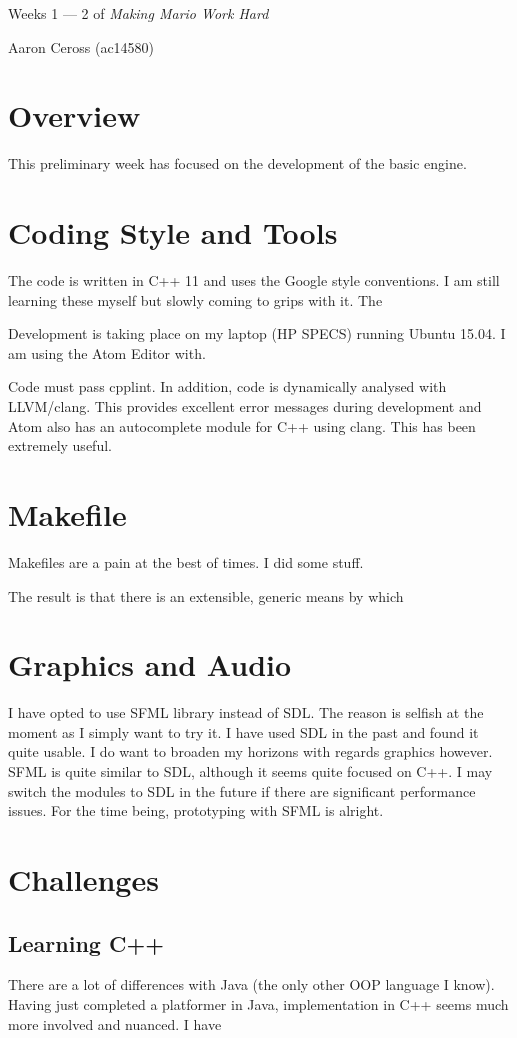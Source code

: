 \documentclass[11pt, a4paper, oneside]{article} %
\begin{document}
\begin{center}\huge Weeks 1 --- 2 of \textit{Making Mario Work Hard}
\par \Large Aaron Ceross (ac14580)
\end{center}


\section{Overview}
This preliminary week has focused on the development of the basic engine.

\section{Coding Style and Tools}

The code is written in C++ 11 and uses the Google style conventions. I am still
learning these myself but slowly coming to grips with it. The

\par

Development is taking place on my laptop (HP SPECS) running Ubuntu 15.04. I am
using the Atom Editor with.

Code must pass cpplint. In addition, code is dynamically analysed with
LLVM/clang. This provides excellent error messages during development and Atom
also has an autocomplete module for C++ using clang. This has been extremely
useful.

\section{Makefile}

Makefiles are a pain at the best of times. I did some stuff.

The result is that there is an extensible, generic means by which

\section{Graphics and Audio}

I have opted to use SFML library instead of SDL. The reason is selfish at the
moment as I simply want to try it. I have used SDL in the past and found it
quite usable. I do want to broaden my horizons with regards graphics however.
\tabularnewline
SFML is quite similar to SDL, although it seems quite focused on C++. I may
switch the modules to SDL in the future if there are significant performance
issues. For the time being, prototyping with SFML is alright.

\section{Challenges}

\subsection{Learning C++}

There are a lot of differences with Java (the only other OOP language I know).
Having just completed a platformer in Java, implementation in C++ seems much
more involved and nuanced. I have
\end{document}
